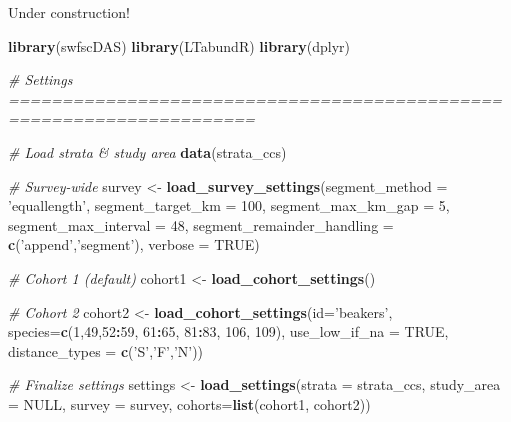 \documentclass[
]{book}
\newenvironment{Shaded}{\begin{snugshade}}{\end{snugshade}}
\newcommand{\CommentTok}[1]{\textcolor[rgb]{0.56,0.35,0.01}{\textit{#1}}}
\newcommand{\DataTypeTok}[1]{\textcolor[rgb]{0.13,0.29,0.53}{#1}}
\newcommand{\DecValTok}[1]{\textcolor[rgb]{0.00,0.00,0.81}{#1}}
\newcommand{\KeywordTok}[1]{\textcolor[rgb]{0.13,0.29,0.53}{\textbf{#1}}}
\newcommand{\NormalTok}[1]{#1}
\newcommand{\OperatorTok}[1]{\textcolor[rgb]{0.81,0.36,0.00}{\textbf{#1}}}
\newcommand{\OtherTok}[1]{\textcolor[rgb]{0.56,0.35,0.01}{#1}}
\newcommand{\StringTok}[1]{\textcolor[rgb]{0.31,0.60,0.02}{#1}}
\begin{document}
Under construction!

\begin{Shaded}
\begin{Highlighting}[]
\KeywordTok{library}\NormalTok{(swfscDAS)}
\KeywordTok{library}\NormalTok{(LTabundR)}
\KeywordTok{library}\NormalTok{(dplyr)}

\CommentTok{# Settings =====================================================================}

\CommentTok{# Load strata & study area}
\KeywordTok{data}\NormalTok{(strata_ccs)}

\CommentTok{# Survey-wide}
\NormalTok{survey <-}\StringTok{ }
\StringTok{  }\KeywordTok{load_survey_settings}\NormalTok{(}\DataTypeTok{segment_method =} \StringTok{'equallength'}\NormalTok{,}
                       \DataTypeTok{segment_target_km =} \DecValTok{100}\NormalTok{,}
                       \DataTypeTok{segment_max_km_gap =} \DecValTok{5}\NormalTok{,}
                       \DataTypeTok{segment_max_interval =} \DecValTok{48}\NormalTok{,}
                       \DataTypeTok{segment_remainder_handling =} \KeywordTok{c}\NormalTok{(}\StringTok{'append'}\NormalTok{,}\StringTok{'segment'}\NormalTok{),}
                       \DataTypeTok{verbose =} \OtherTok{TRUE}\NormalTok{)}

\CommentTok{# Cohort 1 (default)}
\NormalTok{cohort1 <-}\StringTok{ }\KeywordTok{load_cohort_settings}\NormalTok{()}

\CommentTok{# Cohort 2}
\NormalTok{cohort2 <-}\StringTok{ }
\StringTok{  }\KeywordTok{load_cohort_settings}\NormalTok{(}\DataTypeTok{id=}\StringTok{'beakers'}\NormalTok{,}
                       \DataTypeTok{species=}\KeywordTok{c}\NormalTok{(}\DecValTok{1}\NormalTok{,}\DecValTok{49}\NormalTok{,}\DecValTok{52}\OperatorTok{:}\DecValTok{59}\NormalTok{, }\DecValTok{61}\OperatorTok{:}\DecValTok{65}\NormalTok{, }\DecValTok{81}\OperatorTok{:}\DecValTok{83}\NormalTok{, }\DecValTok{106}\NormalTok{, }\DecValTok{109}\NormalTok{),}
                       \DataTypeTok{use_low_if_na =} \OtherTok{TRUE}\NormalTok{,}
                       \DataTypeTok{distance_types =} \KeywordTok{c}\NormalTok{(}\StringTok{'S'}\NormalTok{,}\StringTok{'F'}\NormalTok{,}\StringTok{'N'}\NormalTok{))}

\CommentTok{# Finalize settings}
\NormalTok{settings <-}\StringTok{ }\KeywordTok{load_settings}\NormalTok{(}\DataTypeTok{strata =}\NormalTok{ strata_ccs,}
                          \DataTypeTok{study_area =} \OtherTok{NULL}\NormalTok{,}
                          \DataTypeTok{survey =}\NormalTok{ survey,}
                          \DataTypeTok{cohorts=}\KeywordTok{list}\NormalTok{(cohort1,}
\NormalTok{                                       cohort2))}



\end{Highlighting}
\end{Shaded}
\end{document}
